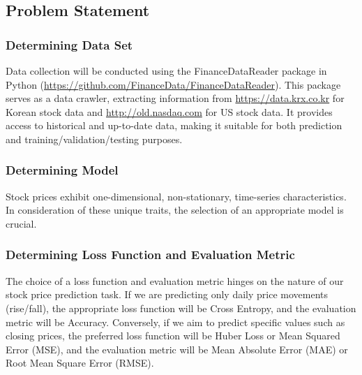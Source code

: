\subsection{Problem Statement}

\subsubsection{Determining Data Set}

Data collection will be conducted using the FinanceDataReader package in Python (\url{https://github.com/FinanceData/FinanceDataReader}). 
This package serves as a data crawler, extracting information from \url{https://data.krx.co.kr} for Korean stock data and \url{http://old.nasdaq.com} for US stock data. 
It provides access to historical and up-to-date data, making it suitable for both prediction and training/validation/testing purposes.

\subsubsection{Determining Model}

Stock prices exhibit one-dimensional, non-stationary, time-series characteristics. 
In consideration of these unique traits, the selection of an appropriate model is crucial.

\subsubsection{Determining Loss Function and Evaluation Metric}

The choice of a loss function and evaluation metric hinges on the nature of our stock price prediction task. 
If we are predicting only daily price movements (rise/fall), the appropriate loss function will be Cross Entropy, and the evaluation metric will be Accuracy. 
Conversely, if we aim to predict specific values such as closing prices, the preferred loss function will be Huber Loss or Mean Squared Error (MSE), 
and the evaluation metric will be Mean Absolute Error (MAE) or Root Mean Square Error (RMSE).



